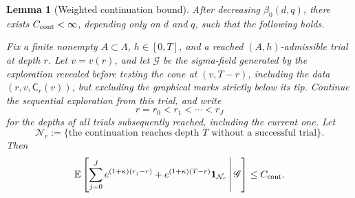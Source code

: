 \documentclass[letterpaper,11pt,reqno]{amsart}
\newtheorem{lemma}[thm]{Lemma}
\theoremstyle{definition}
\begin{document}
\begin{lemma}[Weighted continuation bound]
\label{lem:one-site-continuation}
After decreasing \(\beta_0(d,q)\), there exists \(C_{\rm cont}<\infty\), depending only on \(d\) and \(q\), such that the following holds.

Fix a finite nonempty \(A\subset\Lambda\), \(h\in[0,T]\), and a reached
\((A,h)\)-admissible trial at depth \(r\).  Let \(v=v(r)\), and let
\(\mathscr G\) be the sigma-field generated by the exploration revealed before
testing the cone at \((v,T-r)\), including the data
\((r,v,\mathsf C_r(v))\), but excluding the graphical marks strictly below its tip. 
Continue the sequential exploration from this trial, and write
\[
        r=r_0<r_1<\cdots<r_J
\]
for the depths of all trials subsequently reached, including the current one.
Let
\[
        \mathcal N_r
        :=
        \{\text{the continuation reaches depth \(T\) without a successful trial}\}.
\]
Then
\begin{equation}\label{eq:one-site-continuation}
\mathbb E\left[
    \sum_{j=0}^{J}e^{(1+\kappa)(r_j-r)}
    +e^{(1+\kappa)(T-r)}\mathbf 1_{\mathcal N_r}
    \,\middle|\,
    \mathscr G
\right]
\le C_{\rm cont}.
\end{equation}
\end{lemma}
\end{document}
